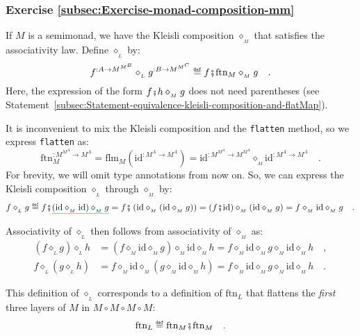 \subsubsection*{Exercise \ref{subsec:Exercise-monad-composition-mm}}

If $M$ is a semimonad, we have the Kleisli composition $\diamond_{_{M}}$
that satisfies the associativity law. Define $\diamond_{_{L}}$ by:
\[
f^{:A\rightarrow M^{M^{B}}}\diamond_{_{L}}g^{:B\rightarrow M^{M^{C}}}\triangleq f\bef\text{ftn}_{M}\diamond_{_{M}}g\quad.
\]
Here, the expression of the form $f\bef h\diamond_{_{M}}g$ does not
need parentheses (see Statement~\ref{subsec:Statement-equivalence-kleisli-composition-and-flatMap}).

It is inconvenient to mix the Kleisli composition and the \lstinline!flatten!
method, so we express \lstinline!flatten! as:
\[
\text{ftn}_{M}^{:M^{M^{A}}\rightarrow M^{A}}=\text{flm}_{M}(\text{id}^{:M^{A}\rightarrow M^{A}})=\text{id}^{:M^{M^{A}}\rightarrow M^{M^{A}}}\diamond_{_{M}}\text{id}^{:M^{A}\rightarrow M^{A}}\quad.
\]
For brevity, we will omit type annotations from now on. So, we can
express the Kleisli composition $\diamond_{_{L}}$ through $\diamond_{_{M}}$
by:
\[
f\diamond_{_{L}}g\triangleq f\bef\gunderline{\left(\text{id}\diamond_{_{M}}\text{id}\right)\diamond_{_{M}}g}=f\bef\left(\text{id}\diamond_{_{M}}\left(\text{id}\diamond_{_{M}}g\right)\right)=\left(f\bef\text{id}\right)\diamond_{_{M}}\left(\text{id}\diamond_{_{M}}g\right)=f\diamond_{_{M}}\text{id}\diamond_{_{M}}g\quad.
\]

Associativity of $\diamond_{_{L}}$ then follows from associativity
of $\diamond_{_{M}}$ as:
\begin{align*}
\left(f\diamond_{_{L}}g\right)\diamond_{_{L}}h & =\left(f\diamond_{_{M}}\text{id}\diamond_{_{M}}g\right)\diamond_{_{M}}\text{id}\diamond_{_{M}}h=f\diamond_{_{M}}\text{id}\diamond_{_{M}}g\diamond_{_{M}}\text{id}\diamond_{_{M}}h\quad,\\
f\diamond_{_{L}}\left(g\diamond_{_{L}}h\right) & =f\diamond_{_{M}}\text{id}\diamond_{_{M}}\left(g\diamond_{_{M}}\text{id}\diamond_{_{M}}h\right)=f\diamond_{_{M}}\text{id}\diamond_{_{M}}g\diamond_{_{M}}\text{id}\diamond_{_{M}}h\quad.
\end{align*}

This definition of $\diamond_{_{L}}$ corresponds to a definition
of $\text{ftn}_{L}$ that flattens the \emph{first} three layers of
$M$ in $M\circ M\circ M\circ M$:
\[
\text{ftn}_{L}\triangleq\text{ftn}_{M}\bef\text{ftn}_{M}\quad.
\]

